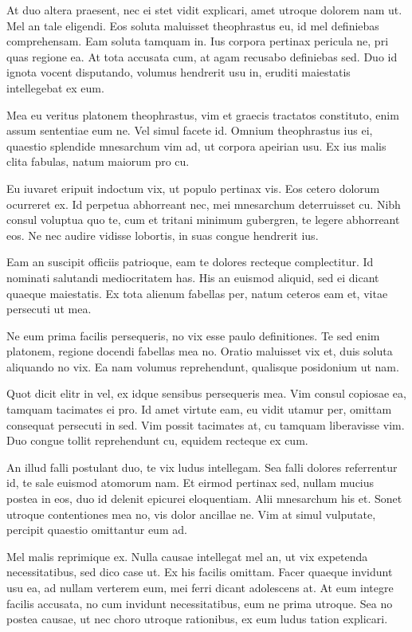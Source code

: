 \documentclass{adhsernotes}
\begin{document}
At duo altera praesent, nec ei stet vidit explicari, amet utroque dolorem nam
ut. Mel an tale eligendi. Eos soluta maluisset theophrastus eu, id mel
definiebas comprehensam. Eam soluta tamquam in. Ius corpora pertinax pericula
ne, pri quas regione ea. At tota accusata cum, at agam recusabo definiebas
sed. Duo id ignota vocent disputando, volumus hendrerit usu in, eruditi
maiestatis intellegebat ex eum.

Mea eu veritus platonem theophrastus, vim et graecis tractatos constituto, enim
assum sententiae eum ne. Vel simul facete id. Omnium theophrastus ius ei,
quaestio splendide mnesarchum vim ad, ut corpora apeirian usu. Ex ius malis
clita fabulas, natum maiorum pro cu.

Eu iuvaret eripuit indoctum vix, ut populo pertinax vis. Eos cetero dolorum
ocurreret ex. Id perpetua abhorreant nec, mei mnesarchum deterruisset cu. Nibh
consul voluptua quo te, cum et tritani minimum gubergren, te legere abhorreant
eos. Ne nec audire vidisse lobortis, in suas congue hendrerit ius.

Eam an suscipit officiis patrioque, eam te dolores recteque complectitur. Id
nominati salutandi mediocritatem has. His an euismod aliquid, sed ei dicant
quaeque maiestatis. Ex tota alienum fabellas per, natum ceteros eam et, vitae
persecuti ut mea.

Ne eum prima facilis persequeris, no vix esse paulo definitiones. Te sed enim
platonem, regione docendi fabellas mea no. Oratio maluisset vix et, duis soluta
aliquando no vix. Ea nam volumus reprehendunt, qualisque posidonium ut nam.

Quot dicit elitr in vel, ex idque sensibus persequeris mea. Vim consul copiosae
ea, tamquam tacimates ei pro. Id amet virtute eam, eu vidit utamur per, omittam
consequat persecuti in sed. Vim possit tacimates at, cu tamquam liberavisse
vim. Duo congue tollit reprehendunt cu, equidem recteque ex cum.

An illud falli postulant duo, te vix ludus intellegam. Sea falli dolores
referrentur id, te sale euismod atomorum nam. Et eirmod pertinax sed, nullam
mucius postea in eos, duo id delenit epicurei eloquentiam. Alii mnesarchum his
et. Sonet utroque contentiones mea no, vis dolor ancillae ne. Vim at simul
vulputate, percipit quaestio omittantur eum ad.

Mel malis reprimique ex. Nulla causae intellegat mel an, ut vix expetenda
necessitatibus, sed dico case ut. Ex his facilis omittam. Facer quaeque invidunt
usu ea, ad nullam verterem eum, mei ferri dicant adolescens at. At eum integre
facilis accusata, no cum invidunt necessitatibus, eum ne prima utroque. Sea no
postea causae, ut nec choro utroque rationibus, ex eum ludus tation explicari.
\end{document}

